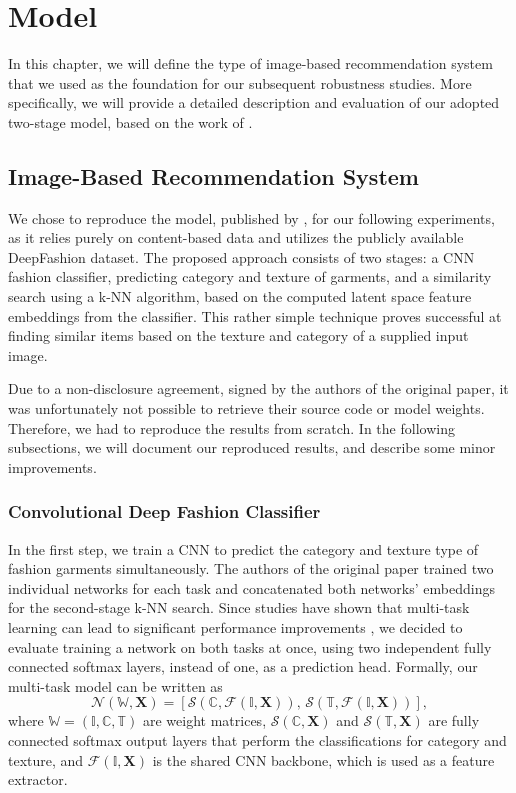 \chapter{Model}
\label{chp:model}
In this chapter, we will define the type of image-based recommendation system that we used as the foundation for our subsequent robustness studies. More specifically, we will provide a detailed description and evaluation of our adopted two-stage model, based on the work of \cite{tuinhof2018image}.

\section{Image-Based Recommendation System}
We chose to reproduce the model, published by \cite{tuinhof2018image}, for our following experiments, as it relies purely on content-based data and utilizes the publicly available DeepFashion dataset. The proposed approach consists of two stages: a \ac{CNN} fashion classifier, predicting category and texture of garments, and a similarity search using a \ac{k-NN} algorithm, based on the computed latent space feature embeddings from the classifier. This rather simple technique proves successful at finding similar items based on the texture and category of a supplied input image. 

Due to a non-disclosure agreement, signed by the authors of the original paper, it was unfortunately not possible to retrieve their source code or model weights. Therefore, we had to reproduce the results from scratch. In the following subsections, we will document our reproduced results, and describe some minor improvements.

\subsection{Convolutional Deep Fashion Classifier}
\label{sec:fashion-classifier}
In the first step, we train a \ac{CNN} to predict the category and texture type of fashion garments simultaneously. The authors of the original paper trained two individual networks for each task and concatenated both networks' embeddings for the second-stage \ac{k-NN} search. Since studies have shown that multi-task learning can lead to significant performance improvements \parencite{zhang2017survey}, we decided to evaluate training a network on both tasks at once, using two independent fully connected softmax layers, instead of one, as a prediction head. Formally, our multi-task model can be written as
\begin{equation}
\mathcal{N}(\mathbb{W}, \boldsymbol{X}) = [\mathcal{S}(\mathbb{C}, \mathcal{F}(\mathbb{I}, \boldsymbol{X})),\,\mathcal{S}(\mathbb{T}, \mathcal{F}(\mathbb{I}, \boldsymbol{X}))],
\label{eq:fashion-cnn}
\end{equation}
where $\mathbb{W} = (\mathbb{I},\mathbb{C},\mathbb{T})$ are weight matrices, $\mathcal{S}(\mathbb{C},\boldsymbol{X})$ and $\mathcal{S}(\mathbb{T},\boldsymbol{X})$ are fully connected softmax output layers that perform the classifications for category and texture, and $\mathcal{F}(\mathbb{I}, \boldsymbol{X})$ is the shared \ac{CNN} backbone, which is used as a feature extractor.

